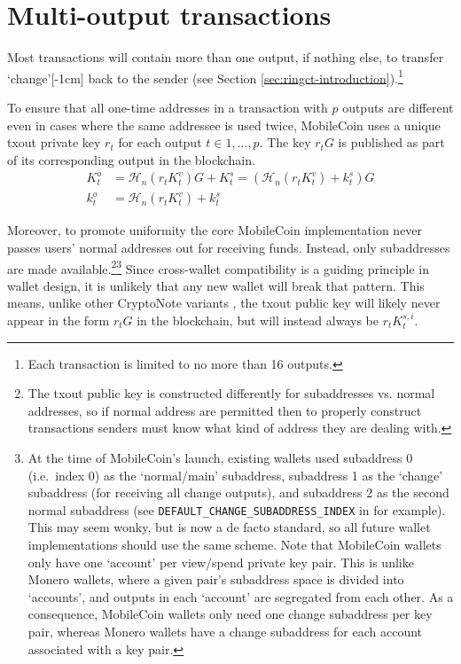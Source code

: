 \section{Multi-output transactions}
\label{sec:multi_out_transactions}

Most transactions will contain more than one output, if nothing else, to transfer `change’[-1cm] back to the sender (see Section \ref{sec:ringct-introduction}).\footnote{Each transaction is limited to no more than 16 outputs.}

To ensure that all one-time addresses in a transaction with $p$ outputs are different even in cases where the same addressee is used twice, MobileCoin uses a unique txout private key $r_t$ for each output $t \in 1, ..., p$. The key $r_t G$ is published as part of its corresponding output in the blockchain.\vspace{.175cm}
\begin{align*}
  K_t^o &= \mathcal{H}_n(r_t K_t^v)G + K_t^s = (\mathcal{H}_n(r_t K_t^v) + k_t^s)G  \\ 
  k_t^o &= \mathcal{H}_n(r_t K_t^v) + k_t^s
\end{align*} 

Moreover, to promote uniformity the core MobileCoin implementation never passes users' normal addresses out for receiving funds. Instead, only subaddresses are made available.\footnote{The txout public key is constructed differently for subaddresses vs. normal addresses, so if normal address are permitted then to properly construct transactions senders must know what kind of address they are dealing with.}\footnote{At the time of MobileCoin's launch, existing wallets used subaddress 0 (i.e.\ index 0) as the `normal/main' subaddress, subaddress 1 as the `change' subaddress (for receiving all change outputs), and subaddress 2 as the second normal subaddress (see {\tt DEFAULT\_CHANGE\_SUBADDRESS\_INDEX} in \cite{mobilecoin-full-service-source-code} for example). This may seem wonky, but is now a de facto standard, so all future wallet implementations should use the same scheme. Note that MobileCoin wallets only have one `account' per view/spend private key pair. This is unlike Monero wallets, where a given pair's subaddress space is divided into `accounts', and outputs in each `account' are segregated from each other. As a consequence, MobileCoin wallets only need one change subaddress per key pair, whereas Monero wallets have a change subaddress for each account associated with a key pair.} Since cross-wallet compatibility is a guiding principle in wallet design, it is unlikely that any new wallet will break that pattern. This means, unlike other CryptoNote variants \cite{cryptoNoteWhitePaper}, the txout public key will likely never appear in the form $r_t G$ in the blockchain, but will instead always be $r_t K^{s,i}_t$.



